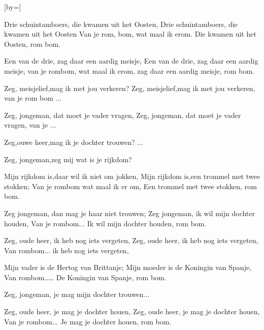  

[by=]




\beginverse
    Drie schuintamboers, die kwamen uit het Oosten,
    Drie schuintamboers, die kwamen uit het Oosten 
    Van je rom, bom, wat maal ik erom. 
    Die kwamen uit het Oosten, rom bom.
\endverse

\beginverse
    Een van de drie, zag daar een aardig meisje, 
    Een van de drie, zag daar een aardig meisje, 
    van je rombom, wat maal ik erom, 
    zag daar een aardig meisje, rom bom. 
\endverse

\beginverse
    Zeg, meisjelief,mag ik met jou verkeren?
    Zeg, meisjelief,mag ik met jou verkeren, \brk van je rom bom ...
\endverse

\beginverse
    Zeg, jongeman, dat moet je vader vragen,
    Zeg, jongeman, dat moet je vader vragen, \brk van je ...
\endverse

\beginverse
    Zeg,ouwe heer,mag ik je dochter trouwen? ...
\endverse

\beginverse
    Zeg, jongeman,zeg mij wat is je rijkdom?
\endverse

\beginverse
    Mijn rijkdom is,daar wil ik niet om jokken,
    Mijn rijkdom is,een trommel met twee stokken;
    Van je rombom wat maal ik er om, 
    Een trommel met twee stokken, rom bom.
\endverse

\beginverse
    Zeg jongeman, dan mag je haar niet trouwen;
    Zeg jongeman, ik wil mijn dochter houden,
    Van je rombom...
    Ik wil mijn dochter houden, rom bom.
\endverse

\beginverse
    Zeg, oude heer, ik heb nog iets vergeten,
    Zeg, oude heer, ik heb nog iets vergeten,
    Van rombom...
    ik heb nog iets vergeten,
\endverse

\beginverse
    Mijn vader is de Hertog van Brittanje;
    Mijn moeder is de Koningin van Spanje,
    Van rombom……
    De Koningin van Spanje, rom bom.
\endverse

\beginverse
    Zeg, jongeman, je mag mijn dochter trouwen...
\endverse

\beginverse
    Zeg, oude heer, je mag je dochter houen,
    Zeg, oude heer, je mag je dochter houen,
    Van je rombom...
    Je mag je dochter houen, rom bom.
\endverse




\endsong
